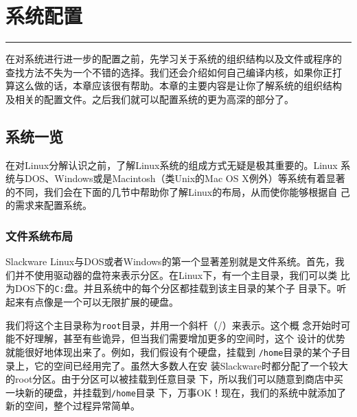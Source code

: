 
\chapter{系统配置}
\label{chap:systemConfig}

\rule[0pt]{\textwidth}{0.1pt}

在对系统进行进一步的配置之前，先学习关于系统的组织结构以及文件或程序的
查找方法不失为一个不错的选择。我们还会介绍如何自己编译内核，如果你正打
算这么做的话，本章应该很有帮助。本章的主要内容是让你了解系统的组织结构
及相关的配置文件。之后我们就可以配置系统的更为高深的部分了。

\section{系统一览}
\label{sec:systemConfig:systemOverview}

在对Linux分解认识之前，了解Linux系统的组成方式无疑是极其重要的。Linux
系统与DOS、Windows或是Macintosh（类Unix的Mac OS X例外）等系统有着显著
的不同，我们会在下面的几节中帮助你了解Linux的布局，从而使你能够根据自
己的需求来配置系统。

\subsection{文件系统布局}
\label{sec:systemConfig:systemOverview:fileSystemLayout}

Slackware Linux与DOS或者Windows的第一个显著差别就是文件系统。首先，我
们并不使用驱动器的盘符来表示分区。在Linux下，有一个主目录，我们可以类
比为DOS下的\texttt{C:}盘。并且系统中的每个分区都挂载到该主目录的某个子
目录下。听起来有点像是一个可以无限扩展的硬盘。

我们将这个主目录称为\texttt{root}目录，并用一个斜杆（/）来表示。这个概
念开始时可能不好理解，甚至有些诡异，但当我们需要增加更多的空间时，这个
设计的优势就能很好地体现出来了。例如，我们假设有个硬盘，挂载到
\texttt{/home}目录的某个子目录上，它的空间已经用完了。虽然大多数人在安
装Slackware时都分配了一个较大的root分区。由于分区可以被挂载到任意目录
下，所以我们可以随意到商店中买一块新的硬盘，并挂载到\texttt{/home}目录
下，万事OK！现在，我们的系统中就添加了新的空间，整个过程异常简单。

